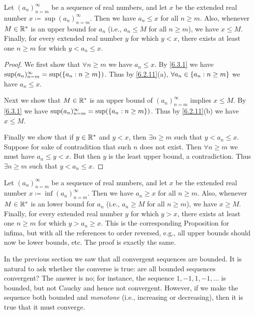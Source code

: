\setcounter{thm}{5}
\begin{prop}\label{6.3.6}
  Let \((a_n)_{n = m}^\infty\) be a sequence of real numbers, and let \(x\) be the extended real number \(x \coloneqq \sup(a_n)_{n = m}^\infty\).
  Then we have \(a_n \leq x\) for all \(n \geq m\).
  Also, whenever \(M \in \mathbb{R}^*\) is an upper bound for \(a_n\) (i.e., \(a_n \leq M\) for all \(n \geq m\)), we have \(x \leq M\).
  Finally, for every extended real number \(y\) for which \(y < x\), there exists at least one \(n \geq m\) for which \(y < a_n \leq x\).
\end{prop}

\begin{proof}
  We first show that \(\forall n \geq m\) we have \(a_n \leq x\).
  By \cref{6.3.1} we have \(\sup(a_n)_{n = m}^\infty = \sup(\left\lbrace a_n : n \geq m\right\rbrace)\).
  Thus by \cref{6.2.11}(a), \(\forall a_n \in \left\lbrace a_n : n \geq m\right\rbrace\) we have \(a_n \leq x\).

  Next we show that \(M \in \mathbb{R}^*\) is an upper bound of \((a_n)_{n = m}^\infty\) implies \(x \leq M\).
  By \cref{6.3.1} we have \(\sup(a_n)_{n = m}^\infty = \sup(\left\lbrace a_n : n \geq m\right\rbrace)\).
  Thus by \cref{6.2.11}(b) we have \(x \leq M\).

  Finally we show that if \(y \in \mathbb{R}^*\) and \(y < x\), then \(\exists n \geq m\) such that \(y < a_n \leq x\).
  Suppose for sake of contradition that such \(n\) does not exist.
  Then \(\forall n \geq m\) we must have \(a_n \leq y < x\).
  But then \(y\) is the least upper bound, a contradiction.
  Thus \(\exists n \geq m\) such that \(y < a_n \leq x\).
\end{proof}

\begin{rmk}\label{6.3.7}
  Let \((a_n)_{n = m}^\infty\) be a sequence of real numbers, and let \(x\) be the extended real number \(x \coloneqq \inf(a_n)_{n = m}^\infty\).
  Then we have \(a_n \geq x\) for all \(n \geq m\).
  Also, whenever \(M \in \mathbb{R}^*\) is an lower bound for \(a_n\) (i.e., \(a_n \geq M\) for all \(n \geq m\)), we have \(x \geq M\).
  Finally, for every extended real number \(y\) for which \(y > x\), there exists at least one \(n \geq m\) for which \(y > a_n \geq x\).
  This is the corresponding Proposition for infima, but with all the references to order reversed, e.g., all upper bounds should now be lower bounds, etc.
  The proof is exactly the same.
\end{rmk}

\begin{note}
  In the previous section we saw that all convergent sequences are bounded.
  It is natural to ask whether the converse is true:
  are all bounded sequences convergent?
  The answer is no;
  for instance, the sequence \(1, -1, 1, -1, \dots\) is bounded, but not Cauchy and hence not convergent.
  However, if we make the sequence both bounded and \emph{monotone} (i.e., increasing or decreasing), then it is true that it must converge.
\end{note}

